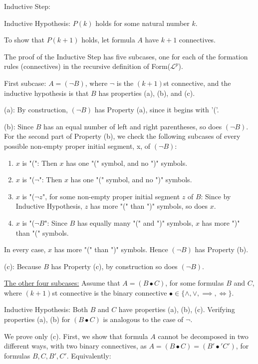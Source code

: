 \documentclass{article}
\begin{document}
Inductive Step:

Inductive Hypothesis: $P(k)$ holds for some natural number $k$. 

To show that $P(k+1)$ holds, let formula $A$ have $k+1$ connectives. 

The proof of the Inductive Step has five subcases, one for each of the formation rules (connectives) in the recursive definition of Form($\mathcal{L}^p$). 

First subcase: $A = (\neg B)$, where $\neg$ is the $(k+1)$st connective, and the inductive hypothesis is that $B$ has properties (a), (b), and (c).  

(a): By construction, $(\neg B)$ has Property (a), since it begins with '('. 

(b): Since $B$ has an equal number of left and right parentheses, so does $(\neg B)$. For the second part of Property (b), we check the following subcases of every possible non-empty proper initial segment, x, of $(\neg B)$:

\begin{enumerate}
    \item $x$ is "(": Then $x$ has one "(" symbol, and no ")" symbols.
    \item $x$ is "($\neg$": Then $x$ has one "(" symbol, and no ")" symbols. 
    \item $x$ is "($\neg z$", for some non-empty proper initial segment $z$ of $B$: Since by Inductive Hypothesis, $z$ has more "(" than ")" symbols, so does $x$. 
    \item $x$ is "($\neg B$": Since $B$ has equally many "(" and ")" symbols, $x$ has more ")" than "(" symbols. 
\end{enumerate}

In every case, $x$ has more "(" than ")" symbols. Hence $(\neg B)$ has Property (b). 

(c): Because $B$ has Property (c), by construction so does $(\neg B)$. 

\underline{The other four subcases:} Assume that $A = (B \bullet C)$, for some formulas $B$ and $C$, where $(k+1)$st connective is the binary connective $\bullet \in \{\wedge, \vee, \implies, \iff \}$.

Inductive Hypothesis: Both $B$ and $C$ have properties (a), (b), (c). Verifying properties (a), (b) for $(B \bullet C)$ is analogous to the case of $\neg$. 

We prove only (c). First, we show that formula $A$ cannot be decomposed in two different ways, with two binary connectives, as $A = (B \bullet C) = (B' \bullet' C')$, for formulas $B, C, B', C'$. Equivalently: 
\end{document}

